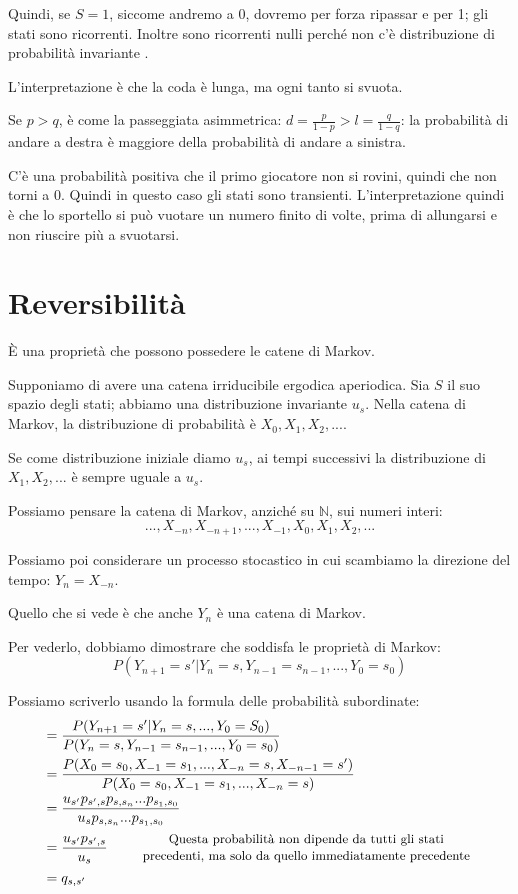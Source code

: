 \documentclass[a4paper,12pt]{book}
\begin{document}
Quindi, se $ S = 1 $, siccome andremo a 0, dovremo per forza ripassar e per 1; gli stati sono ricorrenti. Inoltre sono ricorrenti nulli perché non c'è distribuzione di probabilità invariante . 

L'interpretazione è che la coda è lunga, ma ogni tanto si svuota. 

Se $ p > q $, è come la passeggiata asimmetrica: $ d = \frac{p}{1-p} > l = \frac{q}{1-q} $: la probabilità di andare a destra è maggiore della probabilità di andare a sinistra. 

C'è una probabilità positiva che il primo giocatore non si rovini, quindi che non torni a 0. Quindi in questo caso gli stati sono transienti. L'interpretazione quindi è che lo sportello si può vuotare un numero finito di volte, prima di allungarsi e non riuscire più a svuotarsi. 

\section{Reversibilità}
È una proprietà che possono possedere le catene di Markov. 

Supponiamo di avere una catena irriducibile ergodica aperiodica. Sia $ S $ il suo spazio degli stati; abbiamo una distribuzione invariante $ u_s $. Nella catena di Markov, la distribuzione di probabilità è $ X_0, X_1, X_2, ... $.

Se come distribuzione iniziale diamo $ u_s $, ai tempi successivi la distribuzione di $ X_1, X_2, ... $ è sempre uguale a $ u_s $.

Possiamo pensare la catena di Markov, anziché su $ \mathbb{N} $, sui numeri interi:
$$  ..., X_{-n}, X_{-n+1}, ..., X_{-1}, X_0, X_1, X_2, ... $$

Possiamo poi considerare un processo stocastico in cui scambiamo la direzione del tempo: $ Y_n = X_{-n} $.

Quello che si vede è che anche $ Y_n $ è una catena di Markov. 

Per vederlo, dobbiamo dimostrare che soddisfa le proprietà di Markov:
$$ P (Y_{n+1} = s' | Y_{n} = s, Y_{n-1} = s_{n-1}, ..., Y_0 = s_0) $$ 

Possiamo scriverlo usando la formula delle probabilità subordinate:
\begin{align*}
	& = \frac{P(Y_{n+1} = s' | Y_n = s, ..., Y_0 = S_0)}{P(Y_n = s, Y_{n-1} = s_{n-1}, ..., Y_0 = s_0)} \\ 
	& = \frac{P(X_0=s_0, X_{-1} = s_1, ..., X_{-n} = s, X_{-n-1} = s')}{P(X_0 = s_0, X_{-1} = s_1, ..., X_{-n} = s)} \\
	& = \frac{u_{s'}p_{s',s} p_{s,s_n}...p_{s_1, s_0}}{u_s p_{s,s_n}...p_{s_1, s_0}} \\
	& = \frac{u_{s'} p_{s',s}}{u_s} \qquad \begin{array}{c}
		\text{\small Questa probabilità non dipende da tutti gli stati} \\ 
		\text{\small precedenti, ma solo da quello immediatamente precedente} 
	\end{array} \\
	& = q_{s,s'}
\end{align*}
\end{document}
